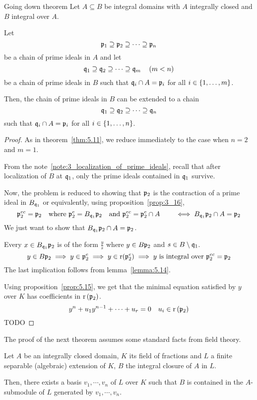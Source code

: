 \begin{theorem}{Going down theorem}{}
\label{thm:5.16}
	Let \(A \subseteq B\) be integral domains with \(A\) integrally closed
	and \(B\) integral over \(A\).

	Let
	\[
		\mathfrak{p}_1 \supseteq \mathfrak{p}_2 \supseteq \cdots \supseteq \mathfrak{p}_n
	\]
	be a chain of prime ideals in \(A\) and let
	\[
		\mathfrak{q}_1 \supseteq \mathfrak{q}_2 \supseteq \cdots \supseteq \mathfrak{q}_m
		\quad \left( m < n \right)
	\]
	be a chain of prime ideals in \(B\) such that \(\mathfrak{q}_i \cap A = \mathfrak{p}_i\)
	for all \(i \in \left\{ 1, \ldots, m \right\}\).

	Then, the chain of prime ideals in \(B\) can be extended to a chain
	\[
		\mathfrak{q}_1 \supseteq \mathfrak{q}_2 \supseteq \cdots \supseteq \mathfrak{q}_n
	\]
	such that \(\mathfrak{q}_i \cap A = \mathfrak{p}_i\)
	for all \(i \in \left\{ 1, \ldots, n \right\}\).
\end{theorem}
\begin{proof}
	As in theorem~\ref{thm:5.11}, we reduce immediately to the case
	when \(n = 2\) and \(m = 1\).

	From the note~\ref{note:3_localization_of_prime_ideals}, recall that
	after localization of \(B\) at \(\mathfrak{q}_1\), only the prime ideals
	contained in \(\mathfrak{q}_1\) survive.

	Now, the problem is reduced to showing that \(\mathfrak{p}_2\) is the
	contraction of a prime ideal in \(B_{\mathfrak{q}_1}\) or equivalently,
	using proposition~\ref{prop:3_16},
	\[
		\mathfrak{p}_2^{ec} = \mathfrak{p}_2 \quad \text{where }
		\mathfrak{p}_2^e = B_{\mathfrak{q}_1} \mathfrak{p}_2 \quad \text{and }
		\mathfrak{p}_2^{ec} = \mathfrak{p}_2^e \cap A
		\quad\quad
		\iff B_{\mathfrak{q}_1} \mathfrak{p}_2 \cap A = \mathfrak{p}_2
	\]
	We just want to show that \(B_{\mathfrak{q}_1} \mathfrak{p}_2 \cap A = \mathfrak{p}_2\).

	Every \(x \in B_{\mathfrak{q}_1} \mathfrak{p}_2\) is of the form \(\frac{y}{s}\)
	where \(y \in B\mathfrak{p}_2\) and \(s \in B \setminus \mathfrak{q}_1\).
	\[
		y \in B\mathfrak{p}_2 \implies y \in \mathfrak{p}_2^e \implies y \in \operatorname{r}(\mathfrak{p}_2^e)
		\implies y \text{ is integral over } \mathfrak{p}_2^{ec} = \mathfrak{p}_2
	\]
	The last implication follows from lemma~\ref{lemma:5.14}.

	Using proposition~\ref{prop:5.15}, we get that the minimal equation
	satisfied by \(y\) over \(K\) has coefficients in \(\operatorname{r}\left( \mathfrak{p}_2 \right)\).
	\[
		y^n + u_1 y^{n-1} + \cdots + u_r = 0 \quad u_i \in \operatorname{r}\left( \mathfrak{p}_2 \right)
	\]
	TODO %
\end{proof}

The proof of the next theorem assumes some standard facts from
field theory.
\begin{proposition}{}{}
\label{prop:5.17}
	Let \(A\) be an integrally closed domain, \(K\) its field of fractions
	and \(L\) a finite separable (algebraic) extension of \(K\), \(B\)
	the integral closure of \(A\) in \(L\).

	Then, there exists a basis \(v_1, \cdots, v_n\) of \(L\) over \(K\)
	such that \(B\) is contained in the \(A\)-submodule of \(L\) generated
	by \(v_1, \cdots, v_n\).
\end{proposition}




